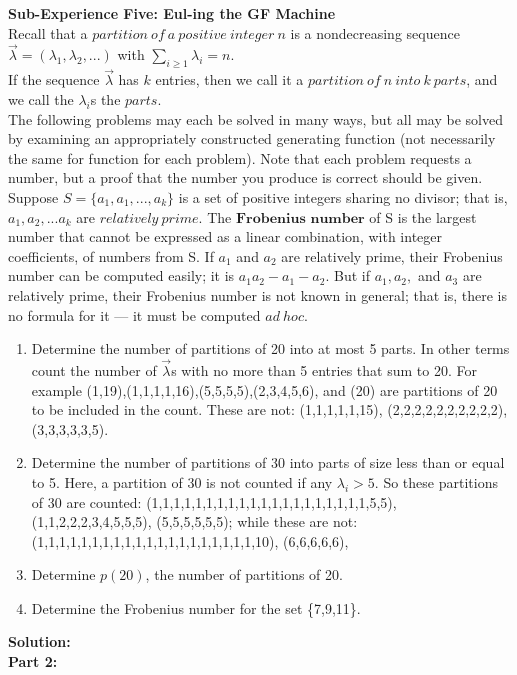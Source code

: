 \documentclass[10pt,a4paper]{report}
\begin{document}
	
	
	

	\textbf{Sub-Experience Five: Eul-ing the GF Machine}\\
	Recall that a $partition\ of\ a\ positive\ integer\ n$ is a nondecreasing sequence $\vec{\lambda} = (\lambda_1,\lambda_2,...)$ with $\sum_{i\geq1}^{}\lambda_i = n$.\\
	If the sequence $\vec{\lambda}$ has $k$ entries, then we call it a $partition\ of\ n\ into\ k\ parts$, and we call the $\lambda_i$s the $parts$.\\
	The following problems may each be solved in many ways, but all may be solved by examining an appropriately constructed generating function (not necessarily the same for function for each problem).  Note that each problem requests a number, but a proof that the number you produce is correct should be given.\\
	Suppose $S = \{a_1,a_1,...,a_k\}$ is a set of positive integers sharing no divisor; that is, $a_1,a_2,...a_k$ are $relatively\ prime$.  The $\textbf{Frobenius number}$ of S is the largest number that cannot be expressed as a linear combination, with integer coefficients, of numbers from S.  If $a_1$ and $a_2$ are relatively prime, their Frobenius number can be computed easily; it is $a_1a_2 - a_1 - a_2$.  But if $a_1,a_2,$ and $a_3$ are relatively prime, their Frobenius number is not known in general; that is, there is no formula for it --- it must be computed $ad\ hoc$.\\
	\begin{enumerate}
		\item Determine the number of partitions of 20 into at most 5 parts.  In other terms count the number of $\vec{\lambda}$s with no more than 5 entries that sum to 20.  For example (1,19),(1,1,1,1,16),(5,5,5,5),(2,3,4,5,6), and (20) are partitions of 20 to be included in the count.  These are not: (1,1,1,1,1,15), (2,2,2,2,2,2,2,2,2,2), (3,3,3,3,3,5).
		\item Determine the number of partitions of 30 into parts of size less than or equal to 5.  Here, a partition of 30 is not counted if any $\lambda_i > 5$.  So these partitions of 30 are counted: (1,1,1,1,1,1,1,1,1,1,1,1,1,1,1,1,1,1,1,1,5,5), (1,1,2,2,2,3,4,5,5,5), (5,5,5,5,5,5); while these are not: (1,1,1,1,1,1,1,1,1,1,1,1,1,1,1,1,1,1,1,1,10), (6,6,6,6,6),
		\item Determine $p(20)$, the number of partitions of 20.
		\item Determine the Frobenius number for the set \{7,9,11\}.\\
	\end{enumerate}
	\textbf{Solution: }\\
	\newline
\textbf{Part 2:}
\end{document}
